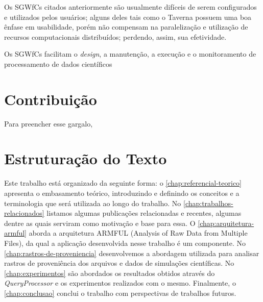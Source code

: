 Os SGWfCs citados anteriormente são usualmente difíceis de serem configurados e utilizados pelos usuários; alguns deles tais como o Taverna possuem uma boa ênfase em usabilidade, porém não compensam na paralelização e utilização de recursos computacionais distribuídos; perdendo, assim, sua efetividade.


Os SGWfCs facilitam o \textit{design}, a manutenção, a execução e o monitoramento de processamento de dados científicos

\section{Contribuição} %

Para preencher esse gargalo, 






\section{Estruturação do Texto}

Este trabalho está organizado da seguinte forma:
o \autoref{chap:referencial-teorico} apresenta o embasamento teórico, introduzindo e definindo os conceitos e a terminologia que será utilizada ao longo do trabalho.
No \autoref{chap:trabalhos-relacionados} listamos algumas publicações relacionadas e recentes, algumas dentre as quais serviram como motivação e base para essa.
O \autoref{chap:arquitetura-armful} aborda a arquitetura  ARMFUL (Analysis of Raw Data from Multiple Files), da qual a aplicação desenvolvida nesse trabalho é um componente.
No \autoref{chap:rastros-de-proveniencia} desenvolvemos a abordagem utilizada para analisar rastros de proveniência dos arquivos e dados de simulações científicas.
No \autoref{chap:experimentos} são abordados os resultados obtidos através do \textit{QueryProcessor} e os experimentos realizados com o mesmo.
Finalmente, o \autoref{chap:conclusao} conclui o trabalho com perspectivas de trabalhos futuros.
